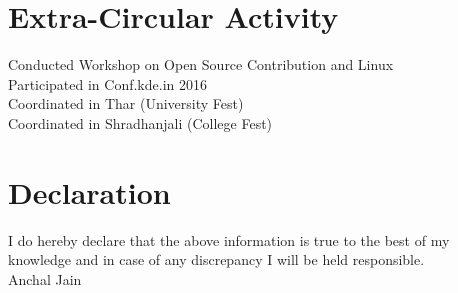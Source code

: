 \documentclass[a4paper,10pt]{article}
\begin{document}
\section{Extra-Circular Activity}
Conducted Workshop on Open Source Contribution and Linux \\
Participated in Conf.kde.in 2016 \\
Coordinated in Thar (University Fest) \\
Coordinated in Shradhanjali (College Fest) \\


\section{Declaration}
I do hereby declare that the above information is true to the best of my knowledge and in case of any discrepancy I will be held responsible. \\

\null\hfill Anchal Jain
\end{document}
